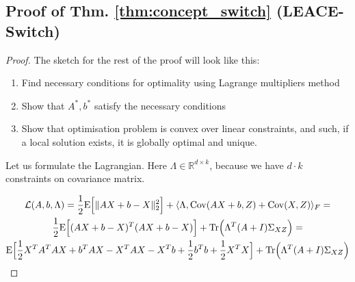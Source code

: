 \subsection{Proof of Thm. \ref{thm:concept_switch} (LEACE-Switch)}

\label{sec:proof_concept_switch}

\begin{proof}



The sketch for the rest of the proof will look like this:
\begin{enumerate}
    \item Find necessary conditions for optimality using Lagrange multipliers method
    \item Show that $A^*, b^*$ satisfy the necessary conditions
    \item Show that optimisation problem is convex over linear constraints, and such, if a local solution exists, it is globally optimal and unique.
\end{enumerate}

Let us formulate the Lagrangian. Here $\Lambda \in \mathbb{R}^{d \times k}$, because we have $d \cdot k$ constraints on covariance matrix.

\begin{multline}    
\mathcal{L}(A, b, \Lambda) = \frac{1}{2}\mathrm{E}\Big[ \lVert{ A X + b - X}\rVert_2^2 \Big] + \langle \Lambda , \mathrm{Cov}(AX + b, Z) + \mathrm{Cov}(X, Z) \rangle_F = \\
\frac{1}{2}\mathrm{E}\Big[ (A X + b - X)^T (A X + b - X) \Big] + \mathrm{Tr} \Big(\Lambda^T (A+I) \Sigma_{XZ} \Big) = \\
\mathrm{E} \Big[ \frac{1}{2}X^TA^TAX + b^TAX - X^TAX - X^Tb + \frac{1}{2}b^Tb + \frac{1}{2}X^TX \Big] + \mathrm{Tr} \Big(\Lambda^T (A+I) \Sigma_{XZ} \Big)
\end{multline}


\end{proof}
